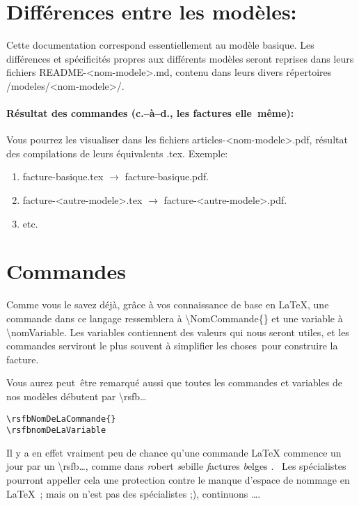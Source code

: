 \documentclass[a4paper,10pt]{article}
\begin{document}
\section{Différences entre les modèles:}
Cette documentation correspond essentiellement au modèle basique. Les différences et  spécificités propres aux différents modèles seront reprises dans leurs fichiers README-<nom-modele>.md, contenu dans leurs divers répertoires \og /modeles/<nom-modele>/\fg.
\paragraph*{Résultat des commandes (c.--à--d., les factures elle~même):} Vous pourrez les visualiser dans les fichiers articles-<nom-modele>.pdf, résultat des compilations de leurs équivalents .tex. Exemple:
\begin{enumerate}
    \item facture-basique.tex $ \rightarrow $ facture-basique.pdf.
    \item facture-<autre-modele>.tex $ \rightarrow $ facture-<autre-modele>.pdf.
    \item etc.
\end{enumerate}




\section{Commandes}

Comme vous le savez déjà, grâce à vos connaissance de base en \LaTeX{}, une commande dans ce langage ressemblera à \textbackslash NomCommande\{\} et une variable à \textbackslash nomVariable. Les variables contiennent des valeurs qui nous seront utiles, et les commandes serviront le plus souvent à simplifier les \og choses\ \fg pour construire la facture.

Vous aurez peut~être remarqué aussi que toutes les commandes et variables de nos modèles débutent par \textbackslash rsfb\dots

\begin{lstlisting}
\rsfbNomDeLaCommande{}
\rsfbnomDeLaVariable
\end{lstlisting}

Il y a en effet vraiment peu de chance qu'une commande \LaTeX{} commence un jour par 
un \textbackslash rsfb\dots, comme dans \og \emph{r}obert \emph{s}ebille \emph{f}actures \emph{b}elges \fg. \
Les spécialistes pourront appeller cela une \og protection contre le manque d'espace de nommage en \LaTeX{}\ \fg; mais on n'est pas des spécialistes ;), continuons \ldots.
\end{document}
